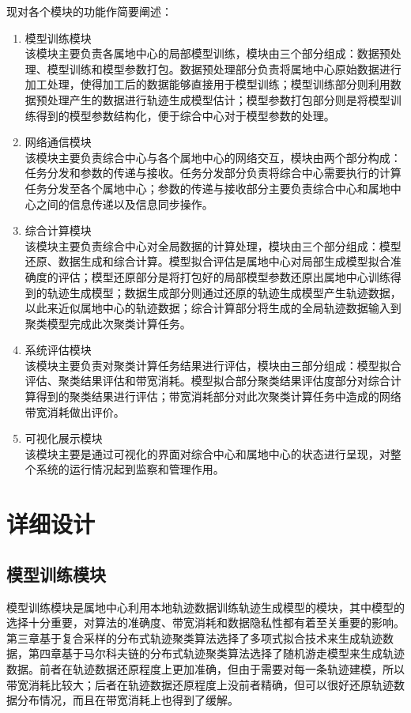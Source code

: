 现对各个模块的功能作简要阐述：
\begin{enumerate}
    \item  模型训练模块\\该模块主要负责各属地中心的局部模型训练，模块由三个部分组成：数据预处理、模型训练和模型参数打包。数据预处理部分负责将属地中心原始数据进行加工处理，使得加工后的数据能够直接用于模型训练；模型训练部分则利用数据预处理产生的数据进行轨迹生成模型估计；模型参数打包部分则是将模型训练得到的模型参数结构化，便于综合中心对于模型参数的处理。
    \item  网络通信模块\\该模块主要负责综合中心与各个属地中心的网络交互，模块由两个部分构成：任务分发和参数的传递与接收。任务分发部分负责将综合中心需要执行的计算任务分发至各个属地中心；参数的传递与接收部分主要负责综合中心和属地中心之间的信息传递以及信息同步操作。
    \item  综合计算模块\\该模块主要负责综合中心对全局数据的计算处理，模块由三个部分组成：模型还原、数据生成和综合计算。模型拟合评估是属地中心对局部生成模型拟合准确度的评估；模型还原部分是将打包好的局部模型参数还原出属地中心训练得到的轨迹生成模型；数据生成部分则通过还原的轨迹生成模型产生轨迹数据，以此来近似属地中心的轨迹数据；综合计算部分将生成的全局轨迹数据输入到聚类模型完成此次聚类计算任务。
    \item  系统评估模块\\该模块主要负责对聚类计算任务结果进行评估，模块由三部分组成：模型拟合评估、聚类结果评估和带宽消耗。模型拟合部分聚类结果评估度部分对综合计算得到的聚类结果进行评估；带宽消耗部分对此次聚类计算任务中造成的网络带宽消耗做出评价。
    \item  可视化展示模块\\该模块主要是通过可视化的界面对综合中心和属地中心的状态进行呈现，对整个系统的运行情况起到监察和管理作用。
\end{enumerate}

\section{详细设计}

\subsection{模型训练模块}
模型训练模块是属地中心利用本地轨迹数据训练轨迹生成模型的模块，其中模型的选择十分重要，对算法的准确度、带宽消耗和数据隐私性都有着至关重要的影响。第三章基于复合采样的分布式轨迹聚类算法选择了多项式拟合技术来生成轨迹数据，第四章基于马尔科夫链的分布式轨迹聚类算法选择了随机游走模型来生成轨迹数据。前者在轨迹数据还原程度上更加准确，但由于需要对每一条轨迹建模，所以带宽消耗比较大；后者在轨迹数据还原程度上没前者精确，但可以很好还原轨迹数据分布情况，而且在带宽消耗上也得到了缓解。


